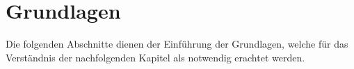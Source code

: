 \chapter{Grundlagen}
\label{ch:Grundlagen}

Die folgenden Abschnitte dienen der Einführung der Grundlagen, welche für das Verständnis der nachfolgenden Kapitel als notwendig erachtet werden.


